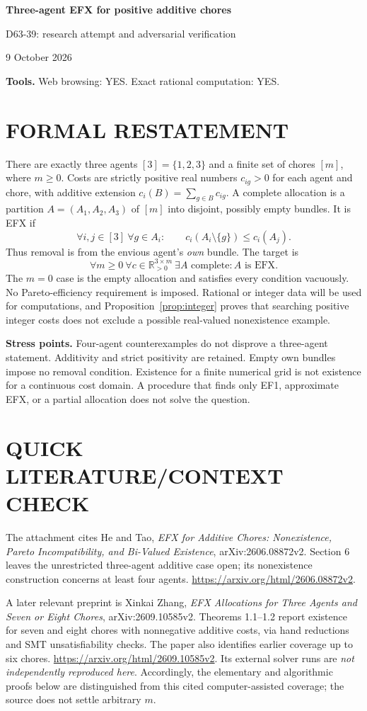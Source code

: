 \documentclass[11pt,a4paper]{article}
\theoremstyle{definition}\newtheorem{definition}[theorem]{Definition}
\theoremstyle{remark}\newtheorem{remark}[theorem]{Remark}
\newcommand{\R}{\mathbb R}\newcommand{\Q}{\mathbb Q}
\newcommand{\1}{\mathbf 1}
\begin{document}
\begin{center}
{\Large\bfseries Three-agent EFX for positive additive chores}\par
\medskip
{\large D63-39: research attempt and adversarial verification}\par
9 October 2026
\end{center}
\textbf{Tools.} Web browsing: YES. Exact rational computation: YES.\par
\section{FORMAL RESTATEMENT}
There are exactly three agents $[3]=\{1,2,3\}$ and a finite set of chores $[m]$, where $m\ge0$. Costs are strictly positive real numbers $c_{ig}>0$ for each agent and chore, with additive extension $c_i(B)=\sum_{g\in B}c_{ig}$. A complete allocation is a partition $A=(A_1,A_2,A_3)$ of $[m]$ into disjoint, possibly empty bundles. It is EFX if
\[
 \forall i,j\in[3]\ \forall g\in A_i:\qquad
 c_i(A_i\setminus\{g\})\le c_i(A_j).
\]
Thus removal is from the envious agent's \emph{own} bundle. The target is
\[
 \forall m\ge0\ \forall c\in\R_{>0}^{3\times m}\ \exists A\text{ complete}: A\text{ is EFX}.
\]
The $m=0$ case is the empty allocation and satisfies every condition vacuously. No Pareto-efficiency requirement is imposed. Rational or integer data will be used for computations, and Proposition~\ref{prop:integer} proves that searching positive integer costs does not exclude a possible real-valued nonexistence example.

\textbf{Stress points.} Four-agent counterexamples do not disprove a three-agent statement. Additivity and strict positivity are retained. Empty own bundles impose no removal condition. Existence for a finite numerical grid is not existence for a continuous cost domain. A procedure that finds only EF1, approximate EFX, or a partial allocation does not solve the question.

\section{QUICK LITERATURE/CONTEXT CHECK}
The attachment cites He and Tao, \emph{EFX for Additive Chores: Nonexistence, Pareto Incompatibility, and Bi-Valued Existence}, arXiv:2606.08872v2. Section 6 leaves the unrestricted three-agent additive case open; its nonexistence construction concerns at least four agents. \url{https://arxiv.org/html/2606.08872v2}.

A later relevant preprint is Xinkai Zhang, \emph{EFX Allocations for Three Agents and Seven or Eight Chores}, arXiv:2609.10585v2. Theorems 1.1--1.2 report existence for seven and eight chores with nonnegative additive costs, via hand reductions and SMT unsatisfiability checks. The paper also identifies earlier coverage up to six chores. \url{https://arxiv.org/html/2609.10585v2}. Its external solver runs are \emph{not independently reproduced here}. Accordingly, the elementary and algorithmic proofs below are distinguished from this cited computer-assisted coverage; the source does not settle arbitrary $m$.
\end{document}
